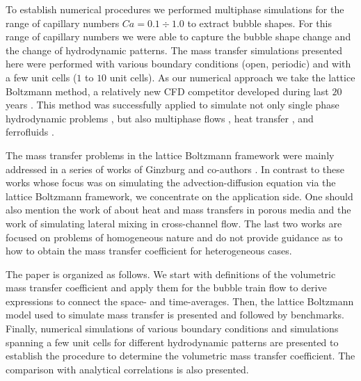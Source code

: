 \documentclass{article}
\begin{document}
To establish numerical procedures we performed multiphase simulations
\cite{kuzmin-binary2d,kuzmin-binary3d} for the range of capillary numbers
$Ca=0.1\div 1.0$ to extract bubble shapes. For this range of capillary numbers
we were able to capture the bubble shape change and the change of hydrodynamic
patterns. The mass transfer simulations presented here were performed with various boundary
conditions (open, periodic) and with a few unit cells ($1$ to $10$ unit cells).
As our numerical approach we take the lattice Boltzmann method, a relatively
new CFD competitor developed during last $20$ years
\cite{frisch,mcnamara,HJ,HSB}. This method was successfully applied to simulate
not only single phase hydrodynamic problems \cite{yu}, but also multiphase
flows \cite{Shan-chen:extended,swift,gunstensen}, heat transfer
\cite{yuan-thermal,zhang-thermal}, and ferrofluids \cite{dellar-ferro,kuzmin-aniso}.

The mass transfer problems in the lattice Boltzmann framework were mainly
addressed in a series of works of Ginzburg and co-authors
\cite{ginzburg-main,ginzburg-boundary-conditions,ginzburg-saturated-flow}.
In contrast to these works whose focus was on simulating the
advection-diffusion equation via the lattice Boltzmann framework, we concentrate
on the application side.  One should also mention the work of \citet{inamuro-scalar-boundary}
about heat and mass transfers in porous media and the work of
\citet{jos-mass} simulating lateral mixing in cross-channel flow.  The last two
works are focused on problems of homogeneous nature and do not provide
guidance as to how to obtain the mass transfer coefficient for heterogeneous cases.

The paper is organized as follows. We start with definitions of the volumetric mass transfer coefficient and apply them 
for the bubble train flow to derive expressions to connect the space- and time-averages.  Then, the lattice
Boltzmann model used to simulate mass transfer is presented and followed by benchmarks. Finally,
numerical simulations of various boundary conditions and simulations spanning a few unit cells for
different hydrodynamic patterns are presented to establish the procedure to determine the
volumetric mass transfer coefficient. The comparison with analytical correlations is also presented.
\end{document}
